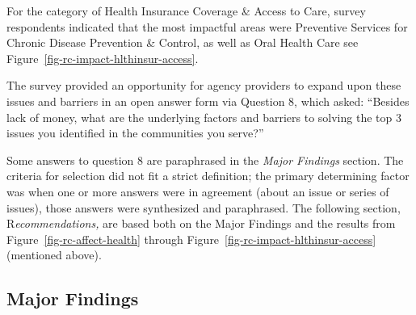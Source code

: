 \documentclass[
  english,
  letterpaper,
]{report}
\begin{document}
For the category of Health Insurance Coverage \& Access to Care, survey
respondents indicated that the most impactful areas were Preventive
Services for Chronic Disease Prevention \& Control, as well as Oral
Health Care see Figure~\ref{fig-rc-impact-hlthinsur-access}.

The survey provided an opportunity for agency providers to expand upon
these issues and barriers in an open answer form via Question 8, which
asked: ``Besides lack of money, what are the underlying factors and
barriers to solving the top 3 issues you identified in the communities
you serve?''

Some answers to question 8 are paraphrased in the \emph{Major Findings}
section. The criteria for selection did not fit a strict definition; the
primary determining factor was when one or more answers were in
agreement (about an issue or series of issues), those answers were
synthesized and paraphrased. The following section,
R\emph{ecommendations,} are based both on the Major Findings and the
results from Figure~\ref{fig-rc-affect-health} through
Figure~\ref{fig-rc-impact-hlthinsur-access} (mentioned above).

\subsection{Major Findings}\label{major-findings-3}
\end{document}
